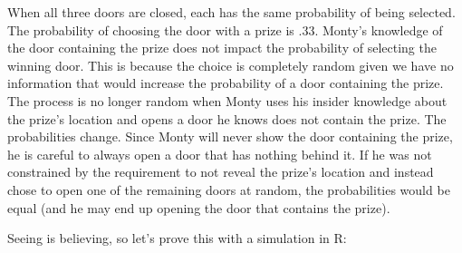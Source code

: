 \documentclass[
]{book}
\begin{document}
When all three doors are closed, each has the same probability of being selected. The probability of choosing the door with a prize is .33. Monty's knowledge of the door containing the prize does not impact the probability of selecting the winning door. This is because the choice is completely random given we have no information that would increase the probability of a door containing the prize. The process is no longer random when Monty uses his insider knowledge about the prize's location and opens a door he knows does not contain the prize. The probabilities change. Since Monty will never show the door containing the prize, he is careful to always open a door that has nothing behind it. If he was not constrained by the requirement to not reveal the prize's location and instead chose to open one of the remaining doors at random, the probabilities would be equal (and he may end up opening the door that contains the prize).

Seeing is believing, so let's prove this with a simulation in R:
\end{document}
